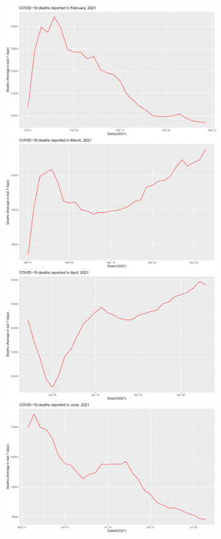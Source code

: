 \documentclass[a4paper]{article}
\theoremstyle{definition}
\begin{document}
\begin{enumerate}[i)]
\begin{enumerate}[1)]
\begin{figure}[H]
				\includegraphics[height=23cm,width=13cm]{images/8.2.2.png}
			\end{figure}
			\begin{figure}[H]
				\centering

\end{figure}
\end{enumerate}
\end{enumerate}
\end{document}
